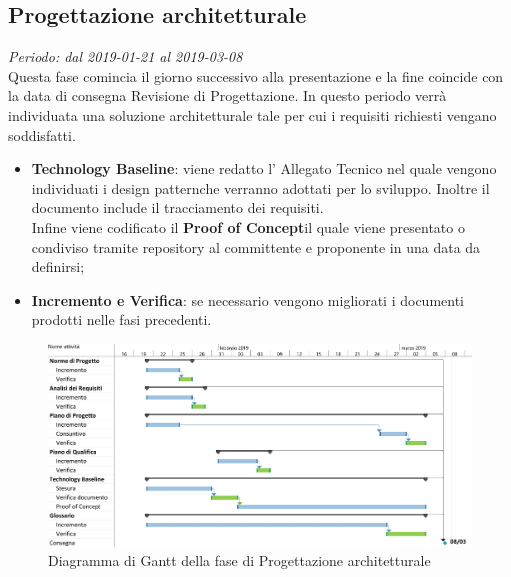 \subsection{Progettazione architetturale}
\textit{Periodo: dal 2019-01-21 al 2019-03-08} \\
Questa fase comincia il giorno successivo alla presentazione e la fine coincide con la data di consegna Revisione di 
Progettazione. In questo periodo verrà individuata una soluzione architetturale 
tale per cui i requisiti richiesti vengano soddisfatti.
\begin{itemize}
	\item \textbf{Technology Baseline}: viene redatto l'
	Allegato Tecnico  nel quale vengono 
	individuati i design 
	pattern\glosp che verranno adottati per lo sviluppo. Inoltre il documento 
	include il tracciamento dei requisiti.\\
	Infine viene codificato il \textbf{Proof of Concept}\glosp il 
	quale viene presentato o condiviso tramite repository al committente e 
	proponente in una data da definirsi;
	\item \textbf{Incremento e Verifica}: se necessario vengono migliorati i 
	documenti prodotti nelle fasi precedenti.
\end{itemize}

\begin{figure}[H]
	\includegraphics[width=0.99\linewidth]{res/images/gantt_pa.jpg}
	\caption{Diagramma di Gantt della fase di Progettazione architetturale}
\end{figure}


